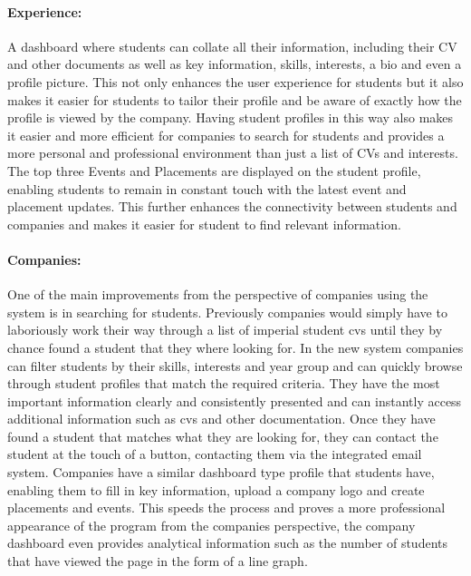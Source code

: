 \paragraph{Experience:}
	A dashboard where students can collate all their information, including their CV and other documents as well as key information, skills, interests, a bio and even a profile picture. This not only enhances the user experience for students but it also makes it easier for students to tailor their profile and be aware of exactly how the profile is viewed by the company. Having student profiles in this way also makes it easier and more efficient for companies to search for students and provides a more personal and professional environment than just a list of CVs and interests. The top three Events and Placements are displayed on the student profile, enabling students to remain in constant touch with the latest event and placement updates. This further enhances the connectivity between students and companies and makes it easier for student to find relevant information.

\paragraph{Companies:}
	One of the main improvements from the perspective of companies using the system is in searching for students. Previously companies would simply have to laboriously work their way through a list of imperial student cvs until they by chance found a student that they where looking for. In the new system companies can filter students by their skills, interests and year group and can quickly browse through student profiles that match the required criteria. They have the most important information clearly and consistently presented and can instantly access additional information such as cvs and other documentation. Once they have found a student that matches what they are looking for, they can contact the student at the touch of a button, contacting them via the integrated email system.
	Companies have a similar dashboard type profile that students have, enabling them to fill in key information, upload a company logo and create placements and events. This speeds the process and proves a more professional appearance of the program from the companies perspective, the company dashboard even provides analytical information such as the number of students that have viewed the page in the form of a line graph. 

